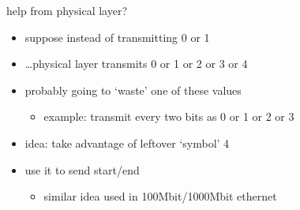 \begin{frame}{help from physical layer?}
    \begin{itemize}
    \item suppose instead of transmitting 0 or 1
    \item \ldots physical layer transmits 0 or 1 or 2 or 3 or 4
    \item probably going to `waste' one of these values
        \begin{itemize}
        \item example: transmit every two bits as 0 or 1 or 2 or 3
        \end{itemize}
    \vspace{.5cm}
    \item<2-> idea: take advantage of leftover `symbol' 4
    \item<2-> use it to send start/end
        \begin{itemize}
        \item similar idea used in 100Mbit/1000Mbit ethernet
        \end{itemize}
    \end{itemize}
\end{frame}

